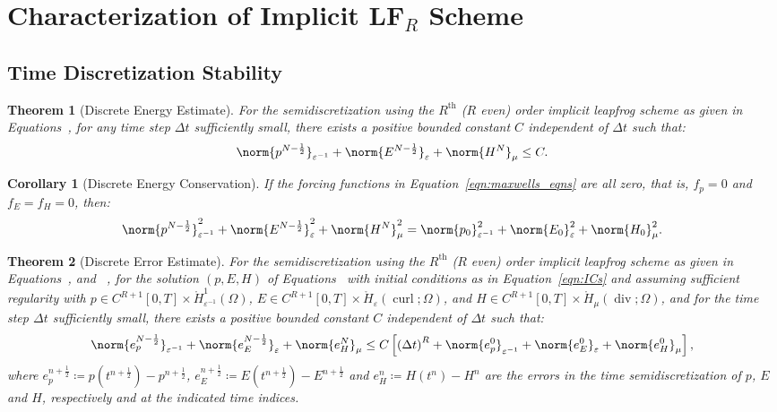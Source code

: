 \documentclass{amsart}
\theoremstyle{thmstyleone}%
\newtheorem{theorem}{Theorem}%
\theoremstyle{thmstyletwo}%
\theoremstyle{thmstylethree}%
\newtheorem{corollary}{Corollary}[theorem]
\DeclareMathOperator{\curl}{curl}
\def\divgn{\operatorname{div}}
\begin{document}
 \section{Characterization of Implicit LF$_R$ Scheme} \label{sec:implicit_lf$R$}
 
 \subsection{Time Discretization Stability}

\begin{theorem}[Discrete Energy Estimate] \label{thm:dscrt_enrgy_estmt_lfR}
  For the semidiscretization using the $R^{\text{th}}$ ($R$ even) order implicit leapfrog scheme as given in Equations~, for any time step $\Delta t$ sufficiently small, there exists a positive bounded constant $C$ independent of $\Delta t$ such that:
\[
  \norm{p^{N - \frac{1}{2}}}_{\varepsilon^{-1}} + \norm{E^{N - \frac{1}{2}}}_{\varepsilon} + \norm{H^N}_{\mu} \le C.
\]
\end{theorem}


\begin{corollary}[Discrete Energy Conservation]\label{corr:dscrt_enrgy_cnsrvtn_lfR}
If the forcing functions in Equation~\eqref{eqn:maxwells_eqns} are all zero, that is, $f_p = 0$ and $f_E = f_H = 0$, then:
\[
  \norm{p^{N - \frac{1}{2}}}^2_{\varepsilon^{-1}} + \norm{E^{N - \frac{1}{2}}}^2_{\varepsilon} + \norm{H^N}^2_{\mu} = \norm{p_0}^2_{\varepsilon^{-1}} + \norm{E_0}^2_{\varepsilon} + \norm{H_0}^2_{\mu}.
\]
\end{corollary}

\begin{theorem}[Discrete Error Estimate]\label{thm:dscrt_error_estmt_lfR}
For the semidiscretization using the $R^{\text{th}}$ ($R$ even) order implicit leapfrog scheme as given in Equations~, and ~, for the solution $(p, E, H)$ of Equations~ with initial conditions as in Equation~\eqref{eqn:ICs} and assuming sufficient regularity with $p \in C^{R+1}[0, T] \times \mathring{H}^1_{\varepsilon^{-1}}(\Omega)$, $E \in C^{R+1}[0, T] \times \mathring{H}_{\varepsilon}(\curl; \Omega)$, and $H \in C^{R+1}[0, T] \times \mathring{H}_{\mu}(\divgn; \Omega)$, and for the time step $\Delta t$ sufficiently small, there exists a positive bounded constant $C$ independent of $\Delta t$ such that:
\[
  \norm{e_p^{N - \frac{1}{2}}}_{\varepsilon^{-1}} + \norm{e_E^{N - \frac{1}{2}}}_{\varepsilon} + \norm{e_H^N}_{\mu} \le C \left[ \left(\Delta t\right)^R + \norm{e_p^0}_{\varepsilon^{-1}} + \norm{e_E^0}_{\varepsilon} + \norm{e_H^0}_{\mu} \right],
\]
where $e_p^{n + \frac{1}{2}} \coloneq p(t^{n + \frac{1}{2}}) - p^{n+\frac{1}{2}}$, $e_E^{n + \frac{1}{2}} \coloneq E(t^{n + \frac{1}{2}}) - E^{n + \frac{1}{2}}$ and $e_H^n \coloneq H(t^n) - H^n$ are the errors in the time semidiscretization of $p$, $E$ and $H$, respectively and at the indicated time indices.
\end{theorem}
\end{document}
